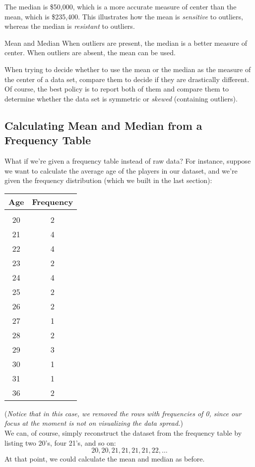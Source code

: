 The median is \$50,000, which is a more accurate measure of center than the mean, which is \$235,400. This illustrates how the mean is \textit{sensitive} to outliers, whereas the median is \textit{resistant} to outliers. 

\begin{proc}{Mean and Median}
When outliers are present, the median is a better measure of center. When outliers are absent, the mean can be used.
\end{proc}

When trying to decide whether to use the mean or the median as the measure of the center of a data set, compare them to decide if they are drastically different.  Of course, the best policy is to report both of them and compare them to determine whether the data set is symmetric or \textit{skewed} (containing outliers).

\subsection{Calculating Mean and Median from a Frequency Table}
What if we're given a frequency table instead of raw data?  For instance, suppose we want to calculate the average age of the players in our dataset, and we're given the frequency distribution (which we built in the last section):
\begin{center}
\begin{tabular}{c c}
\textbf{Age} & \textbf{Frequency}\\
\hline
& \\
20 & 2\\
21 & 4\\
22 & 4\\
23 & 2\\
24 & 4\\
25 & 2\\
26 & 2\\
27 & 1\\
28 & 2\\
29 & 3\\
30 & 1\\
31 & 1\\
36 & 2
\end{tabular}
\end{center}
(\emph{Notice that in this case, we removed the rows with frequencies of 0, since our focus at the moment is not on visualizing the data spread.})\\

We can, of course, simply reconstruct the dataset from the frequency table by listing two 20's, four 21's, and so on:
\[20, 20, 21, 21, 21, 21, 22, \ldots\]
At that point, we could calculate the mean and median as before.
\pagebreak


